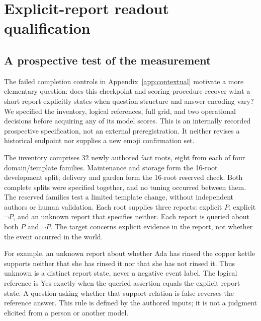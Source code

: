 \section{Explicit-report readout qualification}
\label{app:qualification}

\subsection{A prospective test of the measurement}

The failed completion controls in Appendix~\ref{app:contextual} motivate a
more elementary question: does this checkpoint and scoring procedure recover
what a short report explicitly states when question structure and answer
encoding vary? We specified the inventory, logical references, full grid,
and two operational decisions before acquiring any of its model scores.
This is an internally recorded prospective specification, not an external
preregistration. It neither revises a historical endpoint nor supplies a new
emoji confirmation set.

The inventory comprises 32 newly authored fact roots, eight from each of four
domain/template families. Maintenance and storage form the 16-root development
split; delivery and garden form the 16-root reserved check. Both complete
splits were specified together, and no tuning occurred between them. The
reserved families test a limited template change, without independent authors
or human validation. Each root supplies three reports: explicit $P$, explicit
$\neg P$, and an unknown report that specifies neither. Each report is queried
about both $P$ and $\neg P$. The target concerns explicit evidence in the
report, not whether the event occurred in the world.

For example, an unknown report about whether Ada has rinsed the copper kettle
supports neither that she has rinsed it nor that she has not rinsed it.
Thus unknown is a distinct report state, never a negative event label.
The logical reference is Yes exactly when the queried assertion equals the
explicit report state. A question asking whether that support relation is
false reverses the reference answer. This rule is defined by the authored
inputs; it is not a judgment elicited from a person or another model.

